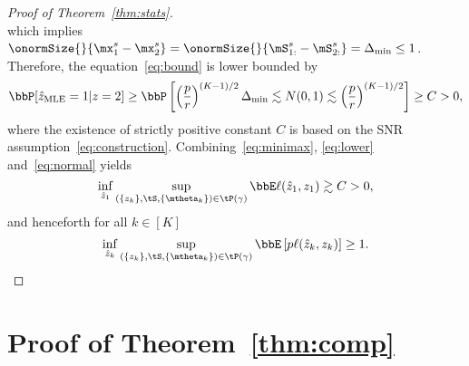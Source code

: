 \documentclass[lettersize,onecolumn,journal]{IEEEtran}
\theoremstyle{definition}
\theoremstyle{definition}
\begin{document}
\begin{proof}[Proof of Theorem~\ref{thm:stats}]
\begin{equation}
\end{equation}
which implies $\onormSize{}{\mx^s_1-\mx^s_2} = \onormSize{}{\mS_{1:}^s-\mS_{2:}^s} = \Delta_{\min} \leq 1$. Therefore, the equation~\eqref{eq:bound} is lower bounded by
\begin{equation}\label{eq:normal}
\bbP[\hat z_{\text{MLE}}=1|z=2] \geq \bbP\left[ \left({p\over r}\right)^{(K-1)/2}\Delta_{\min}\lesssim N(0,1)\lesssim  \left({p\over r}\right)^{(K-1)/2} \right]\geq C>0,
\end{equation}
 where the existence of strictly positive constant $C$ is based on the SNR assumption~\eqref{eq:construction}. Combining~\eqref{eq:minimax}, \eqref{eq:lower} and~\eqref{eq:normal} yields
\[
\inf_{\hat z_1}\sup_{(\{z_k\},\tS,\{\mtheta_k\})\in \tP(\gamma)}\bbE\ell(\hat z_1, z_1)\gtrsim C>0, 
\]
and henceforth for all $k \in [K]$
\[
\inf_{\hat z_k}\sup_{(\{z_k\},\tS,\{\mtheta_k\})\in \tP(\gamma)}\bbE \left[p\ell(\hat z_k, z_k)\right]\geq 1.
\]

\end{proof}



\section*{Proof of Theorem~\ref{thm:comp}}
\end{document}
